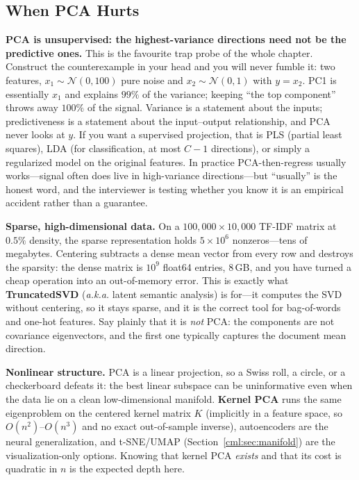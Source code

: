 \subsection{When PCA Hurts}
\label{cml:sec:pca_hurts}

\begin{warningbox}
\textbf{PCA is unsupervised: the highest-variance directions need not be the predictive ones.} This is the favourite trap probe of the whole chapter. Construct the counterexample in your head and you will never fumble it: two features, $x_1 \sim \mathcal{N}(0, 100)$ pure noise and $x_2 \sim \mathcal{N}(0,1)$ with $y = x_2$. PC1 is essentially $x_1$ and explains $99\%$ of the variance; keeping ``the top component'' throws away $100\%$ of the signal. Variance is a statement about the inputs; predictiveness is a statement about the input--output relationship, and PCA never looks at $y$. If you want a supervised projection, that is PLS (partial least squares), LDA (for classification, at most $C-1$ directions), or simply a regularized model on the original features. In practice PCA-then-regress usually works---signal often does live in high-variance directions---but ``usually'' is the honest word, and the interviewer is testing whether you know it is an empirical accident rather than a guarantee.
\end{warningbox}

\textbf{Sparse, high-dimensional data.} On a $100{,}000 \times 10{,}000$ TF-IDF matrix at $0.5\%$ density, the sparse representation holds $5\times10^6$ nonzeros---tens of megabytes. Centering subtracts a dense mean vector from every row and destroys the sparsity: the dense matrix is $10^9$ float64 entries, $8$\,GB, and you have turned a cheap operation into an out-of-memory error. This is exactly what \textbf{TruncatedSVD} (\emph{a.k.a.} latent semantic analysis) is for---it computes the SVD without centering, so it stays sparse, and it is the correct tool for bag-of-words and one-hot features. Say plainly that it is \emph{not} PCA: the components are not covariance eigenvectors, and the first one typically captures the document mean direction.

\textbf{Nonlinear structure.} PCA is a linear projection, so a Swiss roll, a circle, or a checkerboard defeats it: the best linear subspace can be uninformative even when the data lie on a clean low-dimensional manifold. \textbf{Kernel PCA} runs the same eigenproblem on the centered kernel matrix $K$ (implicitly in a feature space, so $O(n^2)$--$O(n^3)$ and no exact out-of-sample inverse), autoencoders are the neural generalization, and t-SNE/UMAP (Section~\ref{cml:sec:manifold}) are the visualization-only options. Knowing that kernel PCA \emph{exists} and that its cost is quadratic in $n$ is the expected depth here.

